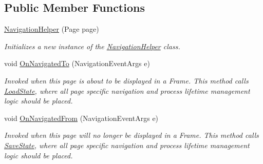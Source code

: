 \subsection*{Public Member Functions}
\begin{DoxyCompactItemize}
\item 
\hyperlink{class_listen_to_me_1_1_common_1_1_navigation_helper_a129e86f4035b95d45005c0f8326a9f66}{Navigation\+Helper} (Page page)
\begin{DoxyCompactList}\small\item\em Initializes a new instance of the \hyperlink{class_listen_to_me_1_1_common_1_1_navigation_helper}{Navigation\+Helper} class. \end{DoxyCompactList}\item 
void \hyperlink{class_listen_to_me_1_1_common_1_1_navigation_helper_ab0345a70d29e6106ed033ce1bca4ebfb}{On\+Navigated\+To} (Navigation\+Event\+Args e)
\begin{DoxyCompactList}\small\item\em Invoked when this page is about to be displayed in a Frame. This method calls \hyperlink{class_listen_to_me_1_1_common_1_1_navigation_helper_a8179285cdfdfeb3a5b80f2e6c8150743}{Load\+State}, where all page specific navigation and process lifetime management logic should be placed. \end{DoxyCompactList}\item 
void \hyperlink{class_listen_to_me_1_1_common_1_1_navigation_helper_ae6ca3deb14714124aca39a75da0b06f2}{On\+Navigated\+From} (Navigation\+Event\+Args e)
\begin{DoxyCompactList}\small\item\em Invoked when this page will no longer be displayed in a Frame. This method calls \hyperlink{class_listen_to_me_1_1_common_1_1_navigation_helper_a63888f37f25238442c4f5f68af554541}{Save\+State}, where all page specific navigation and process lifetime management logic should be placed. \end{DoxyCompactList}\end{DoxyCompactItemize}
